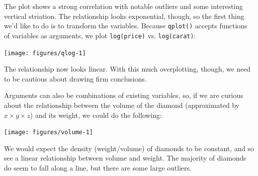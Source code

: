 The plot shows a strong correlation with notable outliers and some
interesting vertical striation. The relationship looks exponential,
though, so the first thing we'd like to do is to transform the
variables. Because \texttt{qplot()} accepts functions of variables as
arguments, we plot \texttt{log(price)} vs. \texttt{log(carat)}:

\begin{Shaded}
\begin{Highlighting}[]
\NormalTok{>}\StringTok{ }\NormalTok{(} 
\end{Highlighting}
\end{Shaded}

\begin{flushleft}\texttt{[image: figures/qlog-1]} \end{flushleft}

\noindent The relationship now looks linear. With this much
overplotting, though, we need to be cautious about drawing firm
conclusions.

Arguments can also be combinations of existing variables, so, if we are
curious about the relationship between the volume of the diamond
(approximated by \(x \times y \times z\)) and its weight, we could do
the following:

\begin{Shaded}
\begin{Highlighting}[]
\NormalTok{>}\StringTok{ }\StringTok{ }\StringTok{ } 
\end{Highlighting}
\end{Shaded}

\begin{flushleft}\texttt{[image: figures/volume-1]} \end{flushleft}

We would expect the density (weight/volume) of diamonds to be constant,
and so see a linear relationship between volume and weight. The majority
of diamonds do seem to fall along a line, but there are some large
outliers.


